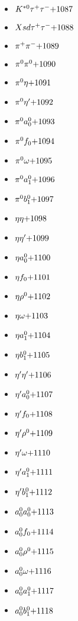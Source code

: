 \begin{multicols}{3}
\begin{itemize}
 \item $ K^{*0} \tau^{+} \tau^{-} \hfill{+1087}$
 \item $ Xsd \tau^{+} \tau^{-} \hfill{+1088}$
 \item $ \pi^{+} \pi^{-} \hfill{+1089}$
 \item $ \pi^{0} \pi^{0} \hfill{+1090}$
 \item $ \pi^{0} \eta \hfill{+1091}$
 \item $ \pi^{0} {\eta^{\prime}} \hfill{+1092}$
 \item $ \pi^{0} a_{0}^{0} \hfill{+1093}$
 \item $ \pi^{0} f_{0} \hfill{+1094}$
 \item $ \pi^{0} \omega \hfill{+1095}$
 \item $ \pi^{0} a_{1}^{0} \hfill{+1096}$
 \item $ \pi^{0} b_{1}^{0} \hfill{+1097}$
 \item $ \eta \eta \hfill{+1098}$
 \item $ \eta {\eta^{\prime}} \hfill{+1099}$
 \item $ \eta a_{0}^{0} \hfill{+1100}$
 \item $ \eta f_{0} \hfill{+1101}$
 \item $ \eta \rho^{0} \hfill{+1102}$
 \item $ \eta \omega \hfill{+1103}$
 \item $ \eta a_{1}^{0} \hfill{+1104}$
 \item $ \eta b_{1}^{0} \hfill{+1105}$
 \item $ {\eta^{\prime}} {\eta^{\prime}} \hfill{+1106}$
 \item $ {\eta^{\prime}} a_{0}^{0} \hfill{+1107}$
 \item $ {\eta^{\prime}} f_{0} \hfill{+1108}$
 \item $ {\eta^{\prime}} \rho^{0} \hfill{+1109}$
 \item $ {\eta^{\prime}} \omega \hfill{+1110}$
 \item $ {\eta^{\prime}} a_{1}^{0} \hfill{+1111}$
 \item $ {\eta^{\prime}} b_{1}^{0} \hfill{+1112}$
 \item $ a_{0}^{0} a_{0}^{0} \hfill{+1113}$
 \item $ a_{0}^{0} f_{0} \hfill{+1114}$
 \item $ a_{0}^{0} \rho^{0} \hfill{+1115}$
 \item $ a_{0}^{0} \omega \hfill{+1116}$
 \item $ a_{0}^{0} a_{1}^{0} \hfill{+1117}$
 \item $ a_{0}^{0} b_{1}^{0} \hfill{+1118}$

\end{itemize}
\end{multicols}
